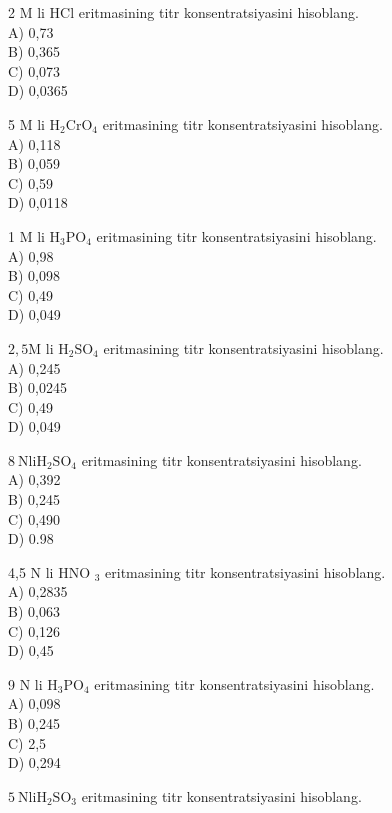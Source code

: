   \item 2 M li HCl eritmasining titr konsentratsiyasini hisoblang.\\
A) 0,73\\
B) 0,365\\
C) 0,073\\
D) 0,0365
  \item 5 M li $\mathrm{H}_{2} \mathrm{CrO}_{4}$ eritmasining titr konsentratsiyasini hisoblang.\\
A) 0,118\\
B) 0,059\\
C) 0,59\\
D) 0,0118
  \item 1 M li $\mathrm{H}_{3} \mathrm{PO}_{4}$ eritmasining titr konsentratsiyasini hisoblang.\\
A) 0,98\\
B) 0,098\\
C) 0,49\\
D) 0,049
  \item $2,5 \mathrm{M}$ li $\mathrm{H}_{2} \mathrm{SO}_{4}$ eritmasining titr konsentratsiyasini hisoblang.\\
A) 0,245\\
B) 0,0245\\
C) 0,49\\
D) 0,049
  \item $8 \mathrm{~N} \mathrm{li} \mathrm{H}_{2} \mathrm{SO}_{4}$ eritmasining titr konsentratsiyasini hisoblang.\\
A) 0,392\\
B) 0,245\\
C) 0,490\\
D) 0.98\\
  \item 4,5 N li HNO ${ }_{3}$ eritmasining titr konsentratsiyasini hisoblang.\\
A) 0,2835\\
B) 0,063\\
C) 0,126\\
D) 0,45
  \item 9 N li $\mathrm{H}_{3} \mathrm{PO}_{4}$ eritmasining titr konsentratsiyasini hisoblang.\\
A) 0,098\\
B) 0,245\\
C) 2,5\\
D) 0,294
  \item $5 \mathrm{~N} \mathrm{li} \mathrm{H}_{2} \mathrm{SO}_{3}$ eritmasining titr konsentratsiyasini hisoblang.\\
